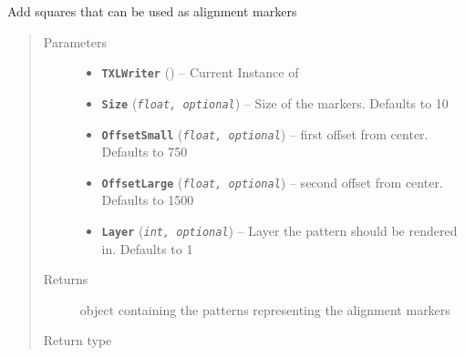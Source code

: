 \documentclass[letterpaper,10pt,english]{sphinxmanual}
\begin{document}
\begin{fulllineitems}
\label{Chapters/PythonModuleReference/ShapeLibrary/TXLWizard.ShapeLibrary.AlignmentMarkers:TXLWizard.ShapeLibrary.AlignmentMarkers.GetAlignmentMarkers}
Add squares that can be used as alignment markers
\begin{quote}\begin{description}
\item[{Parameters}] \leavevmode\begin{itemize}
\item {} 
\textbf{\texttt{TXLWriter}} ({\hyperref[Chapters/PythonModuleReference/TXLWriter/TXLWizard.TXLWriter:TXLWizard.TXLWriter.TXLWriter]{}}) -- Current Instance of {\hyperref[Chapters/PythonModuleReference/TXLWriter/TXLWizard.TXLWriter:TXLWizard.TXLWriter.TXLWriter]{}}

\item {} 
\textbf{\texttt{Size}} (\emph{\texttt{float, optional}}) -- Size of the markers.
Defaults to 10

\item {} 
\textbf{\texttt{OffsetSmall}} (\emph{\texttt{float, optional}}) -- first offset from center.
Defaults to 750

\item {} 
\textbf{\texttt{OffsetLarge}} (\emph{\texttt{float, optional}}) -- second offset from center.
Defaults to 1500

\item {} 
\textbf{\texttt{Layer}} (\emph{\texttt{int, optional}}) -- Layer the pattern should be rendered in.
Defaults to 1

\end{itemize}

\item[{Returns}] \leavevmode
{} object containing the patterns representing the alignment markers

\item[{Return type}] \leavevmode
{\hyperref[Chapters/PythonModuleReference/Patterns/TXLWizard.Patterns.Structure:TXLWizard.Patterns.Structure.Structure]{}}

\end{description}\end{quote}

\end{fulllineitems}
\end{document}
